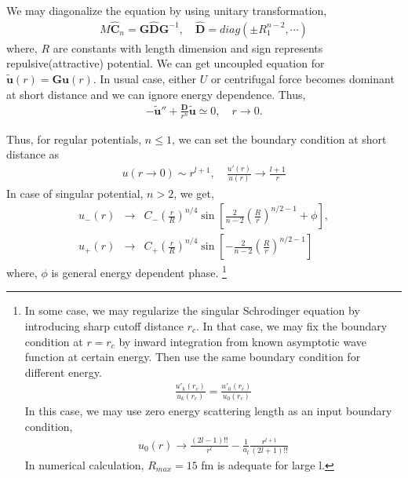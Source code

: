 \documentclass[10pt]{article}
\def\bm{\boldsymbol}
\newcommand{\bea}{\begin{eqnarray}}
\newcommand{\eea}{\end{eqnarray}}
\newcommand{\no}{\nonumber \\}
\begin{document}
We may diagonalize the equation by using unitary transformation,
\bea
M\hat{\bm C}_n={\bm G} \hat{\bm D} {\bm G}^{-1},\quad
\hat{\bm D}=diag(\pm R_1^{n-2},\cdots )
\eea
where, $R$ are constants with length dimension
and sign represents repulsive(attractive) potential.
We can get uncoupled equation for
 $\tilde{\bm u}(r)={\bm G}{\bm u}(r)$.
In usual case, either $U$ or centrifugal force
becomes dominant at short distance and we can ignore
energy dependence. Thus,
\bea
-\tilde{\bm u}''+\frac{\bm D}{r^n}\tilde{\bm u}\simeq 0, \quad r\to 0.
\eea

Thus, for regular potentials, $ n\leq 1$, 
we can set the boundary condition
at short distance as
\bea
u(r\to 0)\sim r^{l+1},\quad \frac{u'(r)}{u(r)}\to \frac{l+1}{r}
\eea
In case of singular potential, $n>2$, we get,
\bea
u_{-}(r)&\to& C_{-}(\frac{r}{R})^{n/4}
  \sin[\frac{2}{n-2}(\frac{R}{r})^{n/2-1}+\phi ],
\no
u_{+}(r)&\to& C_{+}(\frac{r}{R})^{n/4}
  \sin[-\frac{2}{n-2}(\frac{R}{r})^{n/2-1}]
\eea   
where, $\phi$ is general energy dependent phase.
\footnote{
In some case, we may regularize the singular Schrodinger equation
by introducing sharp cutoff distance $r_c$.
In that case, we may fix the boundary condition at $r=r_c$
by inward  integration from 
known asymptotic wave function at certain energy.
Then use the same boundary condition for different energy.
\bea
\frac{u'_k(r_c)}{u_k(r_c)}=\frac{u'_0(r_c)}{u_0(r_c)}
\eea
In this case, we may use zero energy scattering length
as an input boundary condition,
\bea
u_0(r)\to \frac{(2l-1)!!}{r^l}-\frac{1}{a_l}\frac{r^{l+1}}{(2l+1)!!}
\eea 
In numerical calculation, $R_{max}=15$ fm is adequate for large l. 

}
\end{document}
